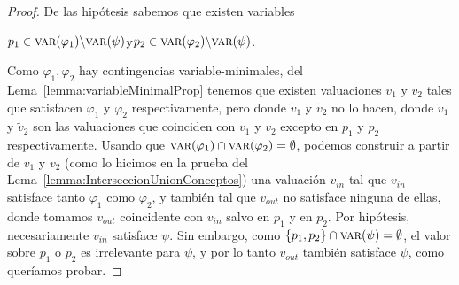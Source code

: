 \begin{proof}
De las hipótesis sabemos que existen variables 
\begin{center}
$p_1 \in \textsc{var}(\varphi_1) \backslash \textsc{var}(\psi)$\quad y\quad $p_2 \in \textsc{var}(\varphi_2) \backslash \textsc{var}(\psi)$.  
\end{center}
Como $\varphi_1, \varphi_2$ hay contingencias variable-minimales, del Lema~\ref{lemma:variableMinimalProp} tenemos que existen valuaciones $v_1$ y $v_2$ tales que satisfacen $\varphi_1$ y $\varphi_2$ respectivamente, pero donde $\tilde{v}_1$ y $\tilde{v}_2$ no lo hacen, donde $\tilde{v}_1$ y $\tilde{v}_2$ son las valuaciones que coinciden con $v_1$ y $v_2$ excepto en $p_1$ y $p_2$ respectivamente. Usando que $\textsc{var}(\varphi_1) \cap \textsc{var}(\varphi_2) = \emptyset$, podemos construir a partir de $v_1$ y $v_2$ (como lo hicimos en la prueba del Lema~\ref{lemma:InterseccionUnionConceptos}) una valuación $v_{in}$ tal que $v_{in}$ satisface  tanto $\varphi_1$ como $\varphi_2$, y también tal que $v_{out}$ no satisface ninguna de ellas, donde tomamos $v_{out}$ coincidente con $v_{in}$ salvo en $p_1$ y en $p_2$. Por hipótesis, necesariamente $v_{in}$ satisface $\psi$. Sin embargo, como $\{p_1, p_2\} \cap \textsc{var}(\psi) = \emptyset$, el valor sobre $p_1$ o $p_2$ es irrelevante para  $\psi$, y por lo tanto $v_{out}$ también satisface $\psi$, como queríamos probar.
\end{proof}

